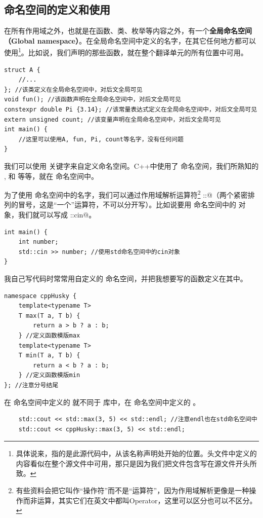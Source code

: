 \subsection*{命名空间的定义和使用}
在所有作用域之外，也就是在函数、类、枚举等内容之外，有一个\textbf{全局命名空间（Global namespace）}。在全局命名空间中定义的名字，在其它任何地方都可以使用\footnote{具体说来，指的是此源代码中，从该名称声明处开始的位置。头文件中定义的内容看似在整个源文件中可用，那只是因为我们把文件包含写在源文件开头所致。}。比如说，我们声明的那些函数，就在整个翻译单元的所有位置中可用。\par
\begin{lstlisting}
struct A {
    //...
}; //该类定义在全局命名空间中，对后文全局可见
void fun(); //该函数声明在全局命名空间中，对后文全局可见
constexpr double Pi {3.14}; //该常量表达式定义在全局命名空间中，对后文全局可见
extern unsigned count; //该变量声明在全局命名空间中，对后文全局可见
int main() {
    //这里可以使用A, fun, Pi, count等名字，没有任何问题
}
\end{lstlisting}\par
我们可以使用 \lstinline@namespace@ 关键字来自定义命名空间。C++中使用了 \lstinline@std@ 命名空间，我们所熟知的 \lstinline@cin@, \lstinline@cout@ 和 \lstinline@endl@ 等等，就在 \lstinline@std@ 命名空间中。\par
为了使用 \lstinline@std@ 命名空间中的名字，我们可以通过作用域解析运算符\footnote{有些资料会把它叫作``操作符''而不是``运算符''，因为作用域解析更像是一种操作而非运算，其实它们在英文中都叫Operator，这里可以区分也可以不区分。} \lstinline@::@（两个紧密排列的冒号，这是``一个''运算符，不可以分开写）。比如说要用 \lstinline@std@ 命名空间中的 \lstinline@cin@ 对象，我们就可以写成 \lstinline@std::cin@。
\begin{lstlisting}
int main() {
    int number;
    std::cin >> number; //使用std命名空间中的cin对象
}
\end{lstlisting}\par
我自己写代码时常常用自定义的 \lstinline@cppHusky@ 命名空间，并把我想要写的函数定义在其中。
\begin{lstlisting}
namespace cppHusky {
    template<typename T>
    T max(T a, T b) {
        return a > b ? a : b;
    } //定义函数模版max
    template<typename T>
    T min(T a, T b) {
        return a < b ? a : b;
    } //定义函数模版min
}; //注意分号结尾
\end{lstlisting}
在 \lstinline@cppHusky@ 命名空间中定义的 \lstinline@max@ 就不同于 \lstinline@algorithm@ 库中，在 \lstinline@std@ 命名空间中定义的 \lstinline@max@。
\begin{lstlisting}
    std::cout << std::max(3, 5) << std::endl; //注意endl也在std命名空间中
    std::cout << cppHusky::max(3, 5) << std::endl;
\end{lstlisting}
